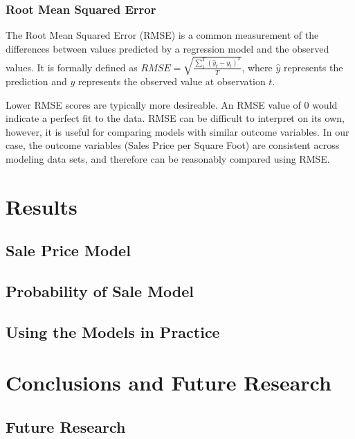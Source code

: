 \documentclass[]{article}
\begin{document}
\subsubsection{Root Mean Squared Error}\label{root-mean-squared-error}

The Root Mean Squared Error (RMSE) is a common measurement of the
differences between values predicted by a regression model and the
observed values. It is formally defined as
\(RMSE = \sqrt{ \frac{\sum_{1}^{T} (\hat{y}_t - y_t)^2}{T} }\), where
\(\hat{y}\) represents the prediction and \(y\) represents the observed
value at observation \(t\).

Lower RMSE scores are typically more desireable. An RMSE value of 0
would indicate a perfect fit to the data. RMSE can be difficult to
interpret on its own, however, it is useful for comparing models with
similar outcome variables. In our case, the outcome variables (Sales
Price per Square Foot) are consistent across modeling data sets, and
therefore can be reasonably compared using RMSE.

\section{Results}\label{results}

\subsection{Sale Price Model}\label{sale-price-model}

\subsection{Probability of Sale Model}\label{probability-of-sale-model}

\subsection{Using the Models in
Practice}\label{using-the-models-in-practice}

\section{Conclusions and Future
Research}\label{conclusions-and-future-research}

\subsection{Future Research}\label{future-research}
\end{document}
